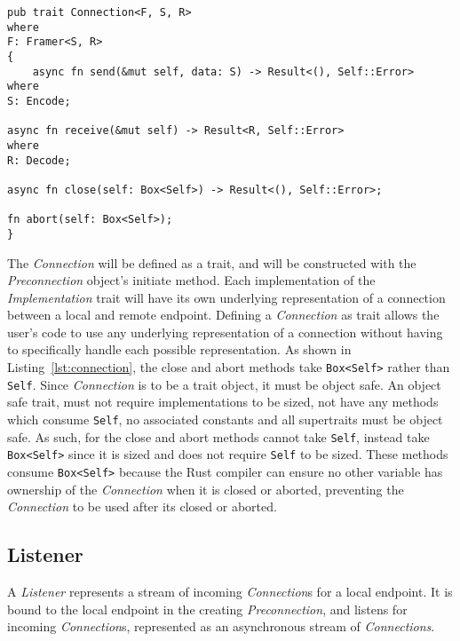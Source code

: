 \begin{lstlisting}[float=h, label=lst:connection, caption={The Connection trait.}]
pub trait Connection<F, S, R>
where
F: Framer<S, R>
{
    async fn send(&mut self, data: S) -> Result<(), Self::Error>
where
S: Encode;

async fn receive(&mut self) -> Result<R, Self::Error>
where
R: Decode;

async fn close(self: Box<Self>) -> Result<(), Self::Error>;

fn abort(self: Box<Self>);
}
\end{lstlisting}

The \emph{Connection} will be defined as a trait, and will be constructed with the \emph{Preconnection} object's
initiate method.
Each implementation of the \emph{Implementation} trait will have its own underlying representation of a connection
between a local and remote endpoint.
Defining a \emph{Connection} as trait allows the user's code to use any underlying representation of a connection
without having to specifically handle each possible representation.
As shown in Listing~\ref{lst:connection}, the close and abort methods take \texttt{Box<Self>} rather than \texttt{Self}.
Since \emph{Connection} is to be a trait object, it must be object safe.
An object safe trait, must not require implementations to be sized, not have any methods which consume \texttt{Self}, no
associated constants and all supertraits must be object safe.
As such, for the close and abort methods cannot take \texttt{Self}, instead take \texttt{Box<Self>} since it is sized
and does not require \texttt{Self} to be sized.
These methods consume \texttt{Box<Self>} because the Rust compiler can ensure no other variable has ownership of the
\emph{Connection} when it is closed or aborted, preventing the \emph{Connection} to be used after its closed or aborted.

\subsection{Listener}\label{subsec:listener}
A \emph{Listener} represents a stream of incoming \emph{Connection}s for a local endpoint.
It is bound to the local endpoint in the creating \emph{Preconnection}, and listens for incoming \emph{Connection}s,
represented as an asynchronous stream of \emph{Connections}.

